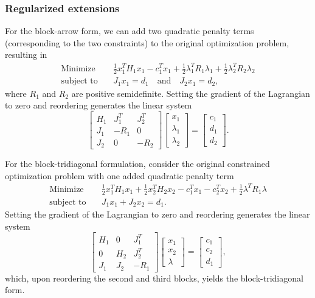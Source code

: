 \documentclass{article}
\begin{document}
\subsubsection*{Regularized extensions}
For the block-arrow form, we can add two quadratic penalty terms (corresponding to the two constraints) to the original optimization problem, resulting in
\begin{align*}
\text{Minimize} \quad & \frac{1}{2} x_1^T H_1 x_1 - c_1^T x_1 + \frac{1}{2} \lambda_1^T R_1 \lambda_1 + \frac{1}{2} \lambda_2^T R_2 \lambda_2 \\
\text{subject to} \quad & J_1 x_1 = d_1 \quad \text{and} \quad J_2 x_1 = d_2,
\end{align*}
where $R_1$ and $R_2$ are positive semidefinite. Setting the gradient of the Lagrangian to zero and reordering generates the linear system
\[
\begin{bmatrix}
H_1 & J_1^T  & J_2^T  \\
J_1 & -R_1 & 0 \\
J_2 & 0 & -R_2
\end{bmatrix}\begin{bmatrix}
    x_1 \\
    \lambda_1 \\
    \lambda_2
\end{bmatrix} = \begin{bmatrix}
    c_1 \\
    d_1 \\
    d_2
\end{bmatrix}.
\]

For the block-tridiagonal formulation, consider the original constrained optimization problem with one added quadratic penalty term
\begin{align*}
\text{Minimize} \quad & \frac{1}{2} x_1^T H_1 x_1 + \frac{1}{2} x_2^T H_2 x_2 - c_1^T x_1 - c_2^T x_2 + \frac{1}{2} \lambda^T R_1 \lambda \\
\text{subject to} \quad & J_1 x_1 + J_2 x_2 = d_1.
\end{align*}
Setting the gradient of the Lagrangian to zero and reordering generates the linear system
\[
\begin{bmatrix}
H_1 & 0 & J_1^T  \\
0 & H_2 & J_2^T \\
J_1 & J_2 & -R_1
\end{bmatrix}\begin{bmatrix}
    x_1 \\
    x_2 \\
    \lambda
\end{bmatrix} = \begin{bmatrix}
    c_1 \\
    c_2 \\
    d_1
\end{bmatrix},
\]
which, upon reordering the second and third blocks, yields the block-tridiagonal form.
\end{document}
